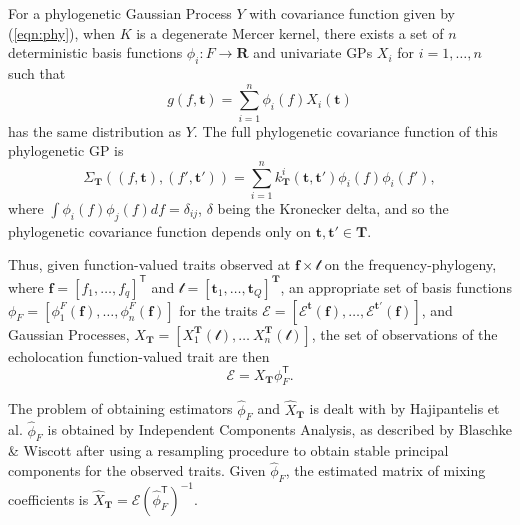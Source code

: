 \documentclass{ws-rv9x6}
\begin{document}
For a phylogenetic Gaussian Process \(Y\) with covariance function given by (\ref{eqn:phy}), when \(K\) is a degenerate Mercer kernel, there exists a set of \(n\) deterministic basis functions \(\phi_i: F \to \mathbf{R}\) and univariate GPs \(X_i\) for \(i = 1,\dots, n\) such that 
\[
g(f, \mathbf{t}) = \sum_{i = 1}^{n} \phi_i(f) X_i(\mathbf{t})
\] 
has the same distribution as \(Y\). The full phylogenetic covariance function of this phylogenetic GP is
\[
\Sigma_{\mathbf{T}}((f, \mathbf{t}), (f', \mathbf{t}')) = \sum_{i = 1}^{n}  k_{\mathbf{T}}^i(\mathbf{t}, \mathbf{t}') \phi_i(f) \phi_i(f'),
\]
where \(\int \phi_i(f) \phi_j(f) df = \delta_{ij}\), \(\delta\) being the Kronecker delta, and so the phylogenetic covariance function depends only on \(\mathbf{t}, \mathbf{t}' \in \mathbf{T}\). 

Thus, given function-valued traits observed at \(\mathbf{f} \times \mathcal{t}\) on the frequency-phylogeny, where \(\mathbf{f} = [f_1, \dots, f_q]^{\mathsf{T}}\) and \(\mathcal{t} = [\mathbf{t}_1, \dots, \mathbf{t}_Q]^{\mathbf{T}}\), an appropriate set of basis functions \(\phi_{F} = [\phi^{F}_1(\mathbf{f}), \dots, \phi^{F}_n(\mathbf{f})]\) for the traits \(\mathcal{E} = [\mathcal{E}^{\mathbf{t}}(\mathbf{f}), \dots, \mathcal{E}^{\mathbf{t}'}(\mathbf{f})]\), and Gaussian Processes, \(X_{\mathbf{T}} = [X_1^{\mathbf{T}}(\mathcal{t}), \dots\ X_n^{\mathbf{T}}(\mathcal{t})]\), the set of observations of the echolocation function-valued trait are then 
\begin{equation}
\mathcal{E} = X_{\mathbf{T}} \phi_F^{\mathsf{T}}.
\label{eqn:inv}
\end{equation}

The problem of obtaining estimators \(\hat{\phi}_F\) and \(\hat{X}_{\mathbf{T}}\) is dealt with by Hajipantelis et al. \cite{hadjipantelis2013function} \(\hat{\phi}_F\) is obtained by Independent Components Analysis, as described by Blaschke \& Wiscott\cite{blaschke2004cubica} after using a resampling procedure to obtain stable principal components for the observed traits. Given \(\hat{\phi}_F\), the estimated matrix of mixing coefficients is \(\hat{X}_{\mathbf{T}} = \mathcal{E} (\hat{\phi}_F^{\mathsf{T}})^{-1}\). 
\end{document}
